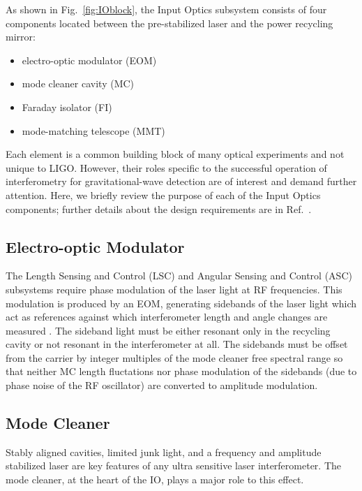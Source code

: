 As shown in Fig.~\ref{fig:IOblock}, the Input Optics subsystem
consists of four components located between the pre-stabilized laser
and the power recycling mirror:
\begin{itemize}
\item electro-optic modulator (EOM) \vspace{-10 pt}
\item mode cleaner cavity (MC) \vspace{-10 pt}
\item Faraday isolator (FI) \vspace{-10 pt}
\item mode-matching telescope (MMT)
\end{itemize}
Each element is a common building block of many optical experiments
and not unique to LIGO. However, their roles specific to the
successful operation of interferometry for gravitational-wave
detection are of interest and demand further attention. Here, we
briefly review the purpose of each of the Input Optics components;
further details about the design requirements are in
Ref.~\citep{Camp1997Input}.




\subsection{Electro-optic Modulator} 
The Length Sensing and Control (LSC) and Angular Sensing and Control
(ASC) subsystems require phase modulation of the laser light at RF
frequencies. This modulation is produced by an EOM, generating
sidebands of the laser light which act as references against which
interferometer length and angle changes are measured
\citep{Fritschel2001Readout}. The sideband light must be either
resonant only in the recycling cavity or not resonant in the
interferometer at all. The sidebands must be offset from the carrier
by integer multiples of the mode cleaner free spectral range so that
neither MC length fluctations nor phase modulation of the sidebands
(due to phase noise of the RF oscillator) are converted to amplitude modulation.


\subsection{Mode Cleaner}
Stably aligned cavities, limited junk light, and a frequency and
amplitude stabilized laser are key features of any ultra sensitive
laser interferometer. The mode cleaner, at the heart of the IO, plays
a major role to this effect.

